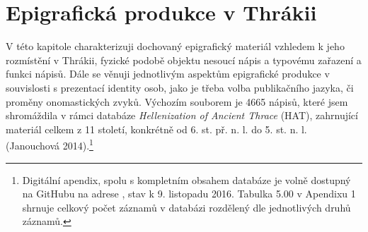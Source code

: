 
\chapter{Epigrafická produkce v Thrákii}
V této kapitole charakterizuji dochovaný epigrafický materiál vzhledem k jeho rozmístění v Thrákii, fyzické podobě objektu nesoucí nápis a typovému zařazení a funkci nápisů. Dále se věnuji jednotlivým aspektům epigrafické produkce v souvislosti s prezentací identity osob, jako je třeba volba publikačního jazyka, či proměny onomastických zvyků. Výchozím souborem je 4665 nápisů, které jsem shromáždila v rámci databáze {\em Hellenization of Ancient Thrace} (HAT), zahrnující materiál celkem z 11 století, konkrétně od 6. st. př. n. l. do 5. st. n. l. (Janouchová 2014).\footnote{Digitální apendix, spolu s kompletním obsahem databáze je volně dostupný na GitHubu na adrese \from[url18], stav k 9. listopadu 2016. Tabulka 5.00 v Apendixu 1 shrnuje celkový počet záznamů v databázi rozdělený dle jednotlivých druhů záznamů.}


